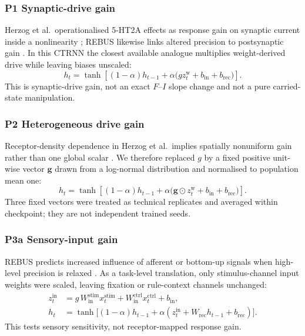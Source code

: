 \subsubsection{P1 Synaptic-drive gain}
Herzog et al.\ operationalised 5-HT2A effects as response gain on synaptic
current inside a nonlinearity \cite{herzog2023}; REBUS likewise links altered
precision to postsynaptic gain \cite{carhartharris2019}. In this CTRNN the
closest available analogue multiplies weight-derived drive while leaving
biases unscaled:
\begin{equation}
 h_t=\tanh\!\left[
 (1-\alpha)h_{t-1}+\alpha\bigl(g z_t^{\mathrm{w}}+b_{\mathrm{in}}+b_{\mathrm{rec}}\bigr)
 \right].
 \label{eq:p1}
\end{equation}
This is synaptic-drive gain, not an exact $F$--$I$ slope change and not a pure
carried-state manipulation.

\subsubsection{P2 Heterogeneous drive gain}
Receptor-density dependence in Herzog et al.\ implies spatially nonuniform gain
rather than one global scalar \cite{herzog2023}. We therefore replaced $g$ by a
fixed positive unit-wise vector $\mathbf{g}$ drawn from a log-normal
distribution and normalised to population mean one:
\begin{equation}
 h_t=\tanh\!\left[
 (1-\alpha)h_{t-1}+\alpha\bigl(\mathbf{g}\odot z_t^{\mathrm{w}}+b_{\mathrm{in}}+b_{\mathrm{rec}}\bigr)
 \right].
 \label{eq:p2}
\end{equation}
Three fixed vectors were treated as technical replicates and averaged within
checkpoint; they are not independent trained seeds.

\subsubsection{P3a Sensory-input gain}
REBUS predicts increased influence of afferent or bottom-up signals when
high-level precision is relaxed \cite{carhartharris2019}. As a task-level
translation, only stimulus-channel input weights were scaled, leaving fixation
or rule-context channels unchanged:
\begin{equation}
\begin{aligned}
 z_t^{\mathrm{in}} &=
 g\,W_{\mathrm{in}}^{\mathrm{stim}}x_t^{\mathrm{stim}}
 +W_{\mathrm{in}}^{\mathrm{ctrl}}x_t^{\mathrm{ctrl}}
 +b_{\mathrm{in}},\\
 h_t &= \tanh\bigl[(1-\alpha)h_{t-1}
 +\alpha(z_t^{\mathrm{in}}+W_{\mathrm{rec}}h_{t-1}+b_{\mathrm{rec}})\bigr].
\end{aligned}
 \label{eq:p3a}
\end{equation}
This tests sensory sensitivity, not receptor-mapped response gain.

